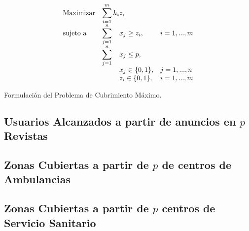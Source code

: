 \documentclass[spanish]{article}
\begin{document}
		\begin{eqfloat}
			\begin{equation}
				\begin{array}{ll@{}ll}
					\text{Maximizar}
						& \displaystyle\sum\limits_{i = 1}^{m} h_{i} & z_{i} 			&							\\
					\text{sujeto a}
						& \displaystyle\sum\limits_{j = 1}^n 	& x_{j} \geq z_i,		&i=1 ,..., m	\\
						& \displaystyle\sum\limits_{j = 1}^n 	& x_{j} \leq p,  		& 						\\
						&                                     &	x_{j} \in \{0,1\},&j=1 ,..., n 	\\
						&                                     &	z_{i} \in \{0,1\},&i=1 ,..., m  \\
				\end{array}
			\end{equation}
			\caption{Formulación del Problema de Cubrimiento Máximo.}
      \label{eq:max_covering}
    \end{eqfloat}

			\paragraph{}


		\subsection{Usuarios Alcanzados a partir de anuncios en $p$ Revistas}
		\label{sec:4.1}

			\paragraph{}


		\subsection{Zonas Cubiertas a partir de $p$ de centros de Ambulancias}
		\label{sec:4.2}

			\paragraph{}


		\subsection{Zonas Cubiertas a partir de $p$ centros de Servicio Sanitario}
		\label{sec:4.3}
\end{document}
